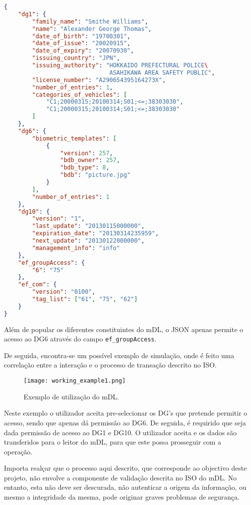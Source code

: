 \begin{lstlisting}[language=json]
{
    "dg1": {
        "family_name": "Smithe Williams",
        "name": "Alexander George Thomas",
        "date_of_birth": "19700301",
        "date_of_issue": "20020915",
        "date_of_expiry": "20070930",
        "issuing_country": "JPN",
        "issuing_authority": "HOKKAIDO PREFECTURAL POLICE\
                              ASAHIKAWA AREA SAFETY PUBLIC",
        "license_number": "A290654395164273X",
        "number_of_entries": 1,
        "categories_of_vehicles": [
            "C1;20000315;20100314;S01;<=;38303030",
            "C1;20000315;20100314;S01;<=;38303030"
        ]
    },
    "dg6": {
        "biometric_templates": [
            {
                "version": 257,
                "bdb_owner": 257,
                "bdb_type": 8,
                "bdb": "picture.jpg"
            }
        ],
        "number_of_entries": 1
    },
    "dg10": {
        "version": "1",
        "last_update": "20130115000000",
        "expiration_date": "20130314235959",
        "next_update": "20130122000000",
        "management_info": "info"
    },
    "ef_groupAccess": {
        "6": "75"
    },
    "ef_com": {
        "version": "0100",
        "tag_list": ["61", "75", "62"]
	}
}
\end{lstlisting}

Além de popular os diferentes constituintes do mDL, o JSON apenas permite o acesso ao DG6 através do campo \texttt{ef\_groupAccess}.

De seguida, encontra-se um possível exemplo de simulação, onde é feito uma correlação entre a interação e o processo de transação descrito no ISO.

\begin{figure}[H]
    \centering
    \texttt{[image: working\_example1.png]}
    \caption{Exemplo de utilização do mDL.}
	\label{fig:working_example1}
\end{figure}

Neste exemplo o utilizador aceita pre-selecionar os DG's que pretende permitir o acesso, sendo que apenas dá permissão ao DG6. De seguida, é requirido que seja dada permissão de acesso ao DG1 e DG10. O utilizador aceita e os dados são transferidos para o leitor do mDL, para que este possa prosseguir com a operação.

Importa realçar que o processo aqui descrito, que corresponde ao objectivo deste projeto, não envolve a componente de validação descrita no ISO do mDL\@. No entanto, esta não deve ser descurada, não autenticar a origem da informação, ou mesmo a integridade da mesma, pode originar graves problemas de segurança\@.

